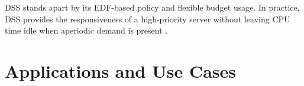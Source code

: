\documentclass[conference]{IEEEtran}
\begin{document}
DSS stands apart by its EDF-based policy and flexible budget usage.  In practice, DSS provides the responsiveness of a high-priority server without leaving CPU time idle when aperiodic demand is present \cite{buttazzo2011hard, laplante2011real}.

\section{Applications and Use Cases}

\printbibliography


\vspace{12pt}
\color{red}
\end{document}
